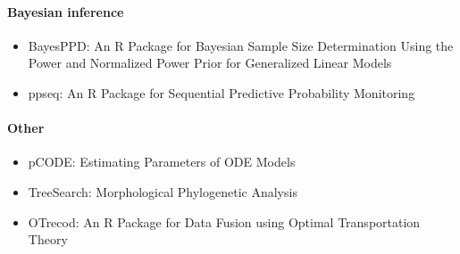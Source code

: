 \hypertarget{bayesian-inference}{%
\paragraph{Bayesian inference}\label{bayesian-inference}}

\begin{itemize}
\tightlist
\item
  BayesPPD: An R Package for Bayesian Sample Size Determination Using the Power and Normalized Power Prior for Generalized Linear Models
\item
  ppseq: An R Package for Sequential Predictive Probability Monitoring
\end{itemize}

\hypertarget{other}{%
\paragraph{Other}\label{other}}

\begin{itemize}
\tightlist
\item
  pCODE: Estimating Parameters of ODE Models
\item
  TreeSearch: Morphological Phylogenetic Analysis
\item
  OTrecod: An R Package for Data Fusion using Optimal Transportation Theory
\end{itemize}


\address{%
Catherine Hurley\\
Maynooth University\\%
\\
%
\url{https://journal.r-project.org}\\%
%
\href{mailto:r-journal@r-project.org}{\nolinkurl{r-journal@r-project.org}}%
}
